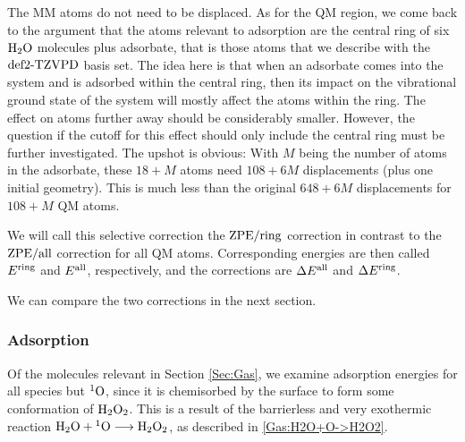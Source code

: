The MM atoms do not need to be displaced. 
As for the QM region, we come back to the argument that the atoms relevant to
adsorption are the central ring of six $\text H _2 \text O$ molecules plus adsorbate, that is
those atoms that we describe with the $\text{def2-TZVPD}$ basis set. The idea here is that
when an adsorbate comes into the system and is adsorbed within the central
ring, then its impact on the vibrational ground state of the system will mostly
affect the atoms within the ring. The effect on atoms further away should be
considerably smaller. However, the question if the cutoff for this effect should
only include the central ring must be further investigated. The upshot is
obvious: With $M$ being the number of atoms in the adsorbate, these $18+M$
atoms need $108+6M$ displacements (plus one initial geometry). This is much
less than the original $648+6M$ displacements for \mbox{$108+M$} QM atoms.

We will call this selective correction the $\text{ZPE}/\text{ring}$ correction in contrast to
the $\text{ZPE}/\text{all}$ correction for all QM atoms. Corresponding energies are then called
$E^{\text{ring}}$ and $E^{\text{all}}$, respectively, and the corrections are $\Delta E^{\text{all}}$ and $\Delta E^{\text{ring}}$. 

We can compare the two corrections in the next section.



\subsubsection{Adsorption}
\label{Sec:Ads:Adsorption}
\newcommand\avg{\enmat{E_{\te {avg}}^{\te{ads}}}}
Of the molecules relevant in Section \ref{Sec:Gas}, we examine adsorption
energies for all species but ${^1\text{O}}$, since it is chemisorbed by the surface
to form some conformation of $\text H _2 \text O_2$. This is a result of the barrierless
and very exothermic reaction \mbox{$\text H _2 \text O+{^1\text{O}}\longrightarrow\text H _2 \text O_2$}, as described in
\eqref{Gas:H2O+O->H2O2}.

